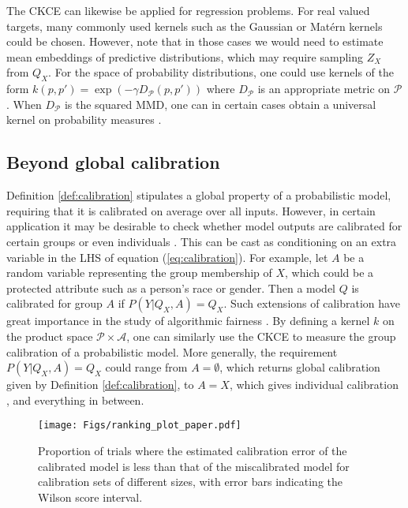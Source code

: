 \documentclass[twocolumn]{article}
\theoremstyle{definition}
\begin{document}
The CKCE can likewise be applied for regression problems. For real valued targets, many commonly used kernels such as the Gaussian or Mat\'ern kernels could be chosen. However, note that in those cases we would need to estimate mean embeddings of predictive distributions, which may require sampling $Z_X$ from $Q_X$. For the space of probability distributions, one could use kernels of the form $k(p,p') = \exp(-\gamma D_{\mathcal{P}}(p, p'))$ where $D_{\mathcal{P}}$ is an appropriate metric on $\mathcal{P}$. When $D_{\mathcal P}$ is the squared MMD, one can in certain cases obtain a universal kernel on probability measures \citep{christmannUniversalKernelsNonStandard2010}. 


\subsection{Beyond global calibration}

Definition \ref{def:calibration} stipulates a global property of a probabilistic model, requiring that it is calibrated on average over all inputs. However, in certain application it may be desirable to check whether model outputs are calibrated for certain groups or even individuals \cite{Pleiss_2017, Zhao_2020}. This can be cast as conditioning on an extra variable in the LHS of equation (\ref{eq:calibration}). For example, let $A$ be a random variable representing the group membership of $X$, which could be a protected attribute such as a person's race or gender. Then a model $Q$ is calibrated for group $A$ if $P(Y|Q_X, A) = Q_X$. Such extensions of calibration have great importance in the study of algorithmic fairness \cite{Chouldechova_2017, Pleiss_2017}. By defining a kernel $k$ on the product space $\mathcal{P} \times \mathcal{A}$, one can similarly use the CKCE to measure the group calibration of a probabilistic model. More generally, the requirement $P(Y|Q_X, A) = Q_X$ could range from $A = \emptyset$, which returns global calibration given by Definition \ref{def:calibration}, to $A = X$, which gives individual calibration \cite{Zhao_2020}, and everything in between. 


\begin{figure*}[ht]
    \centering
    \texttt{[image: Figs/ranking\_plot\_paper.pdf]}
    \caption{Proportion of trials where the estimated calibration error of the calibrated model is less than that of the miscalibrated model for calibration sets of different sizes, with error bars indicating the Wilson score interval.}
    \label{fig:ranking-plot}
\end{figure*}
\end{document}
